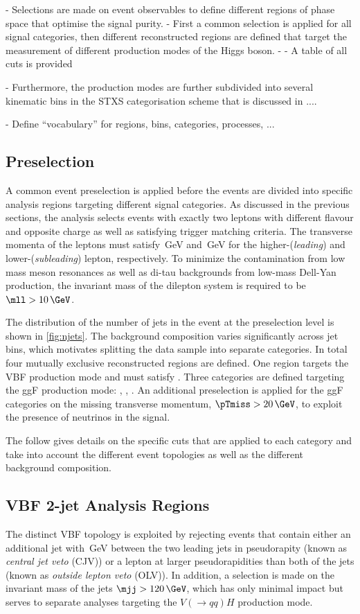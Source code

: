 
- Selections are made on event observables to define different regions of phase space that optimise the signal purity. 
- First a common selection is applied for all signal categories, then different reconstructed regions are defined that target the measurement of different production modes of the Higgs boson. 
- 
- A table of all cuts is provided

- Furthermore, the production modes are further subdivided into several kinematic bins in the STXS categorisation scheme that is discussed in ....

- Define ``vocabulary'' for regions, bins, categories, processes, ...



\subsection{Preselection}
A common event preselection is applied before the events are divided into specific analysis regions targeting different signal categories. 
As discussed in the previous sections, the analysis selects events with exactly two leptons with different flavour and opposite charge as well as satisfying trigger matching criteria. 
The transverse momenta of the leptons must satisfy \,GeV and \,GeV for the higher-\pT (\emph{leading}) and lower-\pT (\emph{subleading}) lepton, respectively.
To minimize the contamination from low mass meson resonances as well as di-tau backgrounds from low-mass Dell-Yan production, the invariant mass of the dilepton system is required to be $\mll > 10\,\GeV$.

The distribution of the number of jets in the event at the preselection level is shown in \cref{fig:njets}. 
The background composition varies significantly across jet bins, which motivates splitting the data sample into separate \Njet categories.
In total four mutually exclusive reconstructed regions are defined.
One region targets the VBF production mode and must satisfy \TwoJet. 
Three categories are defined targeting the ggF production mode: \ZeroJet, \OneJet, \TwoJet. 
An additional preselection is applied for the ggF categories on the missing transverse momentum, $\pTmiss > 20\,\GeV$, to exploit the presence of neutrinos in the signal.

The follow gives details on the specific cuts that are applied to each category and take into account the different event topologies as well as the different background composition.

\subsection{VBF 2-jet Analysis Regions}
The distinct VBF topology is exploited by rejecting events that contain either an additional jet with \,GeV between the two leading jets in pseudorapity (known as \emph{central jet veto} (CJV)) or a lepton at larger pseudorapidities than both of the jets (known as \emph{outside lepton veto} (OLV)). 
In addition, a selection is made on the invariant mass of the jets $\mjj > 120\,\GeV$, which has only minimal impact but serves to separate analyses targeting the $V(\to qq)H$ production mode. 

